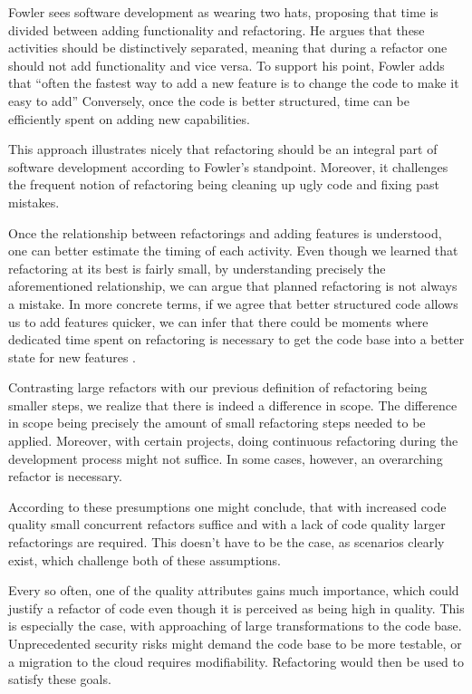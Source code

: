 Fowler sees software development as wearing two hats, 
	proposing that time is divided between adding functionality and refactoring. 
He argues that these activities should be distinctively separated, 
	meaning that during a refactor one should not add functionality and vice versa. 
To support his point, 
	Fowler adds that “often the fastest way to add a new feature is to change the code to make it easy to add” \cite[p.~53]{fowler2018} 
Conversely, once the code is better structured, 
	time can be efficiently spent on adding new capabilities.

This approach illustrates nicely that refactoring 
	should be an integral part of software development according to Fowler's standpoint.  
Moreover, it challenges the frequent notion of refactoring being 
	cleaning up ugly code and fixing past mistakes. 

Once the relationship between refactorings and adding features is understood, 
	one can better estimate the timing of each activity.
Even though we learned that refactoring at its best is fairly small, 
	by understanding precisely the aforementioned relationship, 
	we can argue that planned refactoring is not always a mistake.
In more concrete terms, if we agree that better structured code 
	allows us to add features quicker, 
	we can infer that there could be moments where dedicated time spent on refactoring 
	is necessary to get the code base into a better state for new features \cite[p.~53]{fowler2018}.

Contrasting large refactors with our previous definition of 
	refactoring being smaller steps, we realize 
	that there is indeed a difference in scope.
The difference in scope being precisely 
	the amount of small refactoring steps needed to be applied. 
Moreover, with certain projects, doing continuous refactoring during the development process might not suffice. 
In some cases, however, an overarching refactor is necessary.

According to these presumptions one might conclude, 
	that with increased code quality small concurrent refactors suffice 
	and with a lack of code quality larger refactorings are required. 
This doesn't have to be the case, as scenarios clearly exist, which challenge both of these assumptions.

Every so often, one of the quality attributes gains much importance, 
	which could justify a refactor of code 
	even though it is perceived as being high in quality. 
This is especially the case,
	with approaching of large transformations to the code base. 
Unprecedented security risks might demand the code base 
	to be more testable, or a migration to the cloud requires modifiability. Refactoring would then be used to satisfy these goals.


